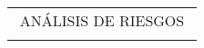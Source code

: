 \begin{adjustbox}{angle=90, captionbelow={DFMEA (Parte 1).}, float={table}[H]}
\begin{tabular}{|ccccccccccccc|}
\end{tabular}

\end{adjustbox}

\newpage

\begin{adjustbox}{angle=90, captionbelow={DFMEA (Parte 2).}, float={table}[H]}

\setlength\arrayrulewidth{0.5pt}
\centering
\begin{tabular}{|ccccccccccccc|}
\hline
\multicolumn{13}{|c|}{ANÁLISIS DE RIESGOS}                                                                                                                                                                                                                                                                                                                                                                                                                                                                                                                                                                                                                                                                                                                                                                                                                                                                                                                                                                                                                                             \\
\multicolumn{1}{|l}{}                                              & \multicolumn{1}{l}{}                                                                                                      & \multicolumn{1}{l}{}                                                                                                      & \multicolumn{1}{l}{}                                                                                                                                    & \multicolumn{1}{l}{}                            & \multicolumn{1}{l}{}                            & \multicolumn{1}{l}{}                            & \multicolumn{1}{l}{}                            & \multicolumn{1}{l}{}                                                                                                                                                                                 & \multicolumn{1}{l}{}                            & \multicolumn{1}{l}{}                            & \multicolumn{1}{l}{}                            & \multicolumn{1}{l|}{}      \\ \cline{2-8}

\end{tabular}
\end{adjustbox}
